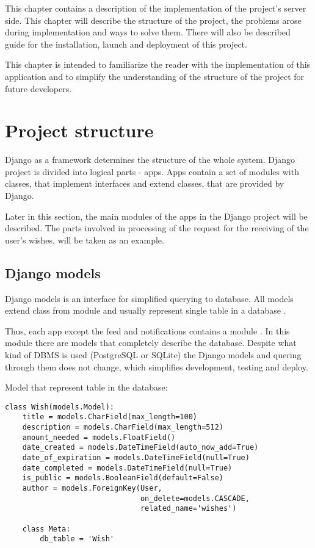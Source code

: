 This chapter contains a description of the implementation of the project's server side. This chapter will describe the
structure of the project, the problems arose during implementation and ways to solve them. There will also be described
guide for the installation, launch and deployment of this project.

This chapter is intended to familiarize the reader with the implementation of this application and to simplify the
understanding of the structure of the project for future developers.



\newcommand{\appitem}[1]{
\item\textbf{#1}.
}
\section{Project structure}
Django as a framework determines the structure of the whole system. Django project is divided into logical parts - apps.
Apps contain a set of modules with classes, that implement interfaces and extend classes, that are provided by Django.

Later in this section, the main modules of the apps in the Django project will be described. The parts involved in
processing of the request for the receiving of the user's wishes, will be taken as an example.

\subsection{Django models}
Django models is an interface for simplified querying to database. All models extend class  from
 module and usually represent single table in a database \cite{djangodocs}.

Thus, each app except the feed and notifications contains a module . In this module there are models that
completely describe the database. Despite what kind of DBMS is used (PostgreSQL or SQLite) the Django models and quering
through them does not change, which simplifies development, testing and deploy.

Model that represent table  in the database:
\begin{lstlisting}
class Wish(models.Model):
    title = models.CharField(max_length=100)
    description = models.CharField(max_length=512)
    amount_needed = models.FloatField()
    date_created = models.DateTimeField(auto_now_add=True)
    date_of_expiration = models.DateTimeField(null=True)
    date_completed = models.DateTimeField(null=True)
    is_public = models.BooleanField(default=False)
    author = models.ForeignKey(User,
                               on_delete=models.CASCADE,
                               related_name='wishes')

    class Meta:
        db_table = 'Wish'

\end{lstlisting}


